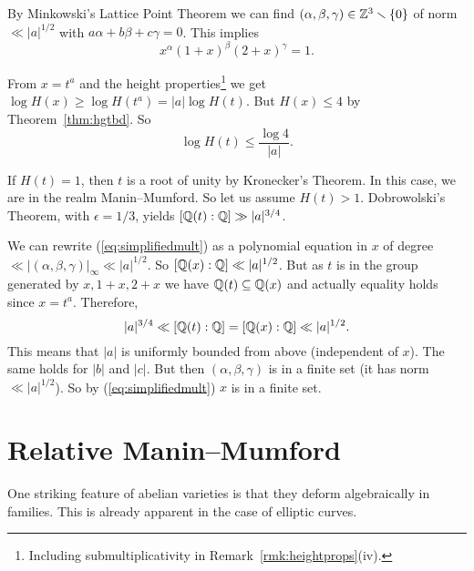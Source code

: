 By Minkowski's Lattice Point Theorem we can find
$(\alpha,\beta,\gamma)\in{\mathbb{Z}}^3\smallsetminus\{0\}$ of norm $\ll
|a|^{1/2}$
with $a\alpha+b\beta+c\gamma=0$. This implies
\begin{equation}
  \label{eq:simplifiedmult}
  x^\alpha(1+x)^\beta(2+x)^\gamma =1.  
\end{equation}

From $x=t^a$ and the height properties\footnote{Including
  submultiplicativity in Remark~\ref{rmk:heightprops}(iv).}  we get
$\log H(x) \ge \log H(t^a) = |a| \log H(t)$. But $H(x)\le  4$ by
Theorem~\ref{thm:hgtbd}. So
\begin{equation*}
  \log H(t)\le \frac{\log 4}{|a|}.
\end{equation*}

If $H(t)=1$, then $t$ is a root of unity by Kronecker's Theorem.
In this case, we are in the realm Manin--Mumford.
So let us assume $H(t)>1$. 
Dobrowolski's Theorem, with $\epsilon=1/3$,  yields $[{\mathbb{Q}}(t):{\mathbb{Q}}] \gg
|a|^{3/4}$.

We can rewrite (\ref{eq:simplifiedmult}) as a polynomial equation
in $x$ of degree $\ll |(\alpha,\beta,\gamma)|_\infty\ll |a|^{1/2}$. 
So $[{\mathbb{Q}}(x):{\mathbb{Q}}] \ll |a|^{1/2}$.
But as $t$ is in the group generated by $x,1+x,2+x$ we have
${\mathbb{Q}}(t)\subseteq{\mathbb{Q}}(x)$ and actually equality holds since $x=t^a$. Therefore,
\begin{equation*}
|a|^{3/4}\ll  [{\mathbb{Q}}(t):{\mathbb{Q}}] = [{\mathbb{Q}}(x):{\mathbb{Q}}]  \ll |a|^{1/2}.
\end{equation*}
This means that $|a|$ is uniformly bounded from above (independent of
$x$). The same holds for $|b|$ and $|c|$. But then
$(\alpha,\beta,\gamma)$ is in a finite set (it has norm
$\ll|a|^{1/2}$).
So by (\ref{eq:simplifiedmult}) $x$ is in a finite set.



\section{Relative Manin--Mumford}


One striking feature of abelian varieties is that they deform
algebraically in families. This is already apparent in the case of
elliptic curves.

